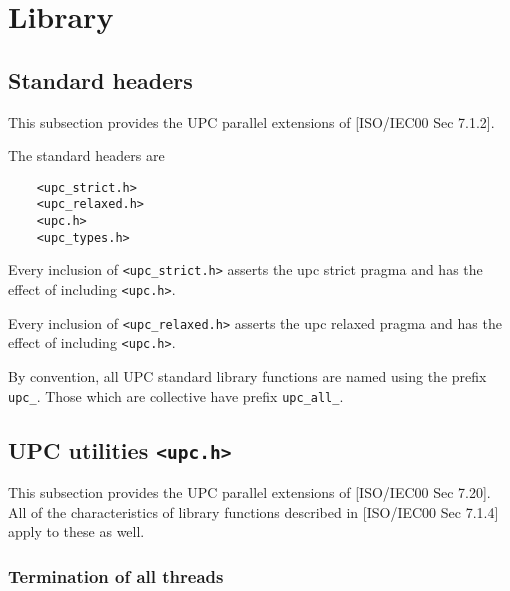 \pagebreak
\section{Library}
\subsection{Standard headers}

\npf This subsection provides the UPC parallel extensions of
    [ISO/IEC00 Sec 7.1.2].


\np The standard headers are 

\begin{verbatim}
    <upc_strict.h> 
    <upc_relaxed.h>
    <upc.h> 
    <upc_types.h> 
\end{verbatim}

\np Every inclusion of {\tt <upc\_strict.h>} asserts the upc 
    strict pragma and has the effect of including {\tt <upc.h>}.

\np Every inclusion of {\tt <upc\_relaxed.h>} asserts the upc 
    relaxed pragma and has the effect of including {\tt <upc.h>}.

\np {}

\np By convention, all UPC standard library functions are  named
    using the prefix {\tt upc\_}.  Those which are collective have
    prefix {\tt upc\_all\_}. 

\pagebreak
\subsection{UPC utilities \tt{<upc.h>}}
\label{upc_h}

\npf This subsection provides the UPC parallel extensions of
    [ISO/IEC00 Sec 7.20].  All of the characteristics of library functions
    described in [ISO/IEC00 Sec 7.1.4] apply to these as well.

\np {}

\subsubsection{Termination of all threads}
\label{upc_global_exit}

